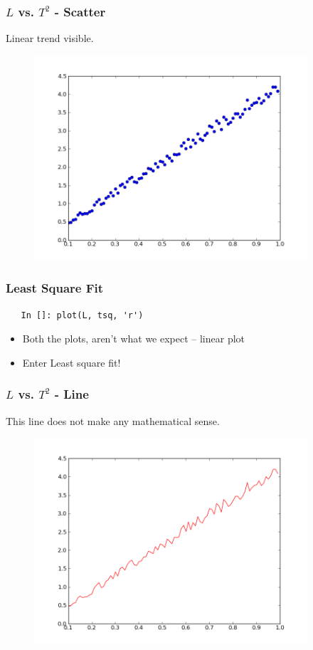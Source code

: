 \begin{frame}[fragile]
\frametitle{$L$ vs. $T^2$ - Scatter}
Linear trend visible.
\begin{figure}
\includegraphics[width=4in]{data/L-Tsq-points}
\end{figure}
\end{frame}

\begin{frame}[fragile]
  \frametitle{Least Square Fit}
\begin{lstlisting}
   In []: plot(L, tsq, 'r')
\end{lstlisting}
  \begin{itemize}
  \item Both the plots, aren't what we expect -- linear plot
  \item Enter Least square fit!
  \end{itemize}
\end{frame}

\begin{frame}[fragile]
\frametitle{$L$ vs. $T^2$ - Line}
This line does not make any mathematical sense.
\vspace{-0.1in}
\begin{figure}
\includegraphics[width=4in]{data/L-Tsq-Line}
\end{figure}
\end{frame}


